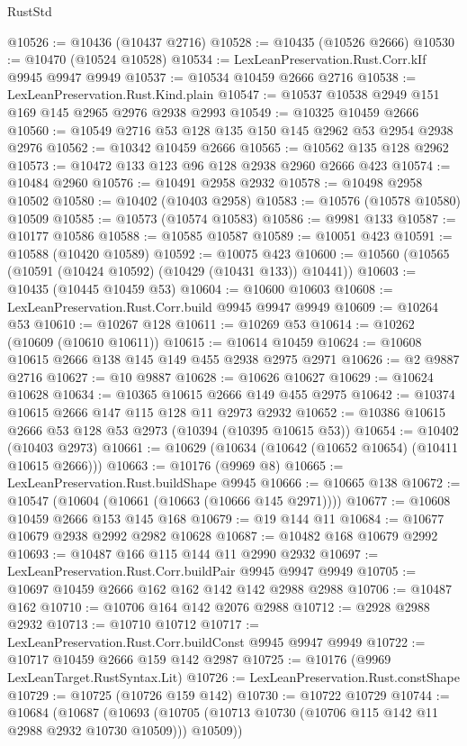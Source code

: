 \begin{lexlean}{RustStd}
\begin{coremodule}
@10526 := @10436 (@10437 @2716)
@10528 := @10435 (@10526 @2666)
@10530 := @10470 (@10524 @10528)
@10534 := LexLeanPreservation.Rust.Corr.kIf @9945 @9947 @9949
@10537 := @10534 @10459 @2666 @2716
@10538 := LexLeanPreservation.Rust.Kind.plain
@10547 := @10537 @10538 @2949 @151 @169 @145 @2965 @2976 @2938 @2993
@10549 := @10325 @10459 @2666
@10560 := @10549 @2716 @53 @128 @135 @150 @145 @2962 @53 @2954 @2938 @2976
@10562 := @10342 @10459 @2666
@10565 := @10562 @135 @128 @2962
@10573 := @10472 @133 @123 @96 @128 @2938 @2960 @2666 @423
@10574 := @10484 @2960
@10576 := @10491 @2958 @2932
@10578 := @10498 @2958 @10502
@10580 := @10402 (@10403 @2958)
@10583 := @10576 (@10578 @10580) @10509
@10585 := @10573 (@10574 @10583)
@10586 := @9981 @133
@10587 := @10177 @10586
@10588 := @10585 @10587
@10589 := @10051 @423
@10591 := @10588 (@10420 @10589)
@10592 := @10075 @423
@10600 := @10560 (@10565 (@10591 (@10424 @10592) (@10429 (@10431 @133)) @10441))
@10603 := @10435 (@10445 @10459 @53)
@10604 := @10600 @10603
@10608 := LexLeanPreservation.Rust.Corr.build @9945 @9947 @9949
@10609 := @10264 @53
@10610 := @10267 @128
@10611 := @10269 @53
@10614 := @10262 (@10609 (@10610 @10611))
@10615 := @10614 @10459
@10624 := @10608 @10615 @2666 @138 @145 @149 @455 @2938 @2975 @2971
@10626 := @2 @9887 @2716
@10627 := @10 @9887
@10628 := @10626 @10627
@10629 := @10624 @10628
@10634 := @10365 @10615 @2666 @149 @455 @2975
@10642 := @10374 @10615 @2666 @147 @115 @128 @11 @2973 @2932
@10652 := @10386 @10615 @2666 @53 @128 @53 @2973 (@10394 (@10395 @10615 @53))
@10654 := @10402 (@10403 @2973)
@10661 := @10629 (@10634 (@10642 (@10652 @10654) (@10411 @10615 @2666)))
@10663 := @10176 (@9969 @8)
@10665 := LexLeanPreservation.Rust.buildShape @9945
@10666 := @10665 @138
@10672 := @10547 (@10604 (@10661 (@10663 (@10666 @145 @2971))))
@10677 := @10608 @10459 @2666 @153 @145 @168
@10679 := @19 @144 @11
@10684 := @10677 @10679 @2938 @2992 @2982 @10628
@10687 := @10482 @168 @10679 @2992
@10693 := @10487 @166 @115 @144 @11 @2990 @2932
@10697 := LexLeanPreservation.Rust.Corr.buildPair @9945 @9947 @9949
@10705 := @10697 @10459 @2666 @162 @162 @142 @142 @2988 @2988
@10706 := @10487 @162
@10710 := @10706 @164 @142 @2076 @2988
@10712 := @2928 @2988 @2932
@10713 := @10710 @10712
@10717 := LexLeanPreservation.Rust.Corr.buildConst @9945 @9947 @9949
@10722 := @10717 @10459 @2666 @159 @142 @2987
@10725 := @10176 (@9969 LexLeanTarget.RustSyntax.Lit)
@10726 := LexLeanPreservation.Rust.constShape
@10729 := @10725 (@10726 @159 @142)
@10730 := @10722 @10729
@10744 := @10684
    (@10687
      (@10693 (@10705 (@10713 @10730 (@10706 @115 @142 @11 @2988 @2932 @10730 @10509))) @10509))

\end{coremodule}
\end{lexlean}
